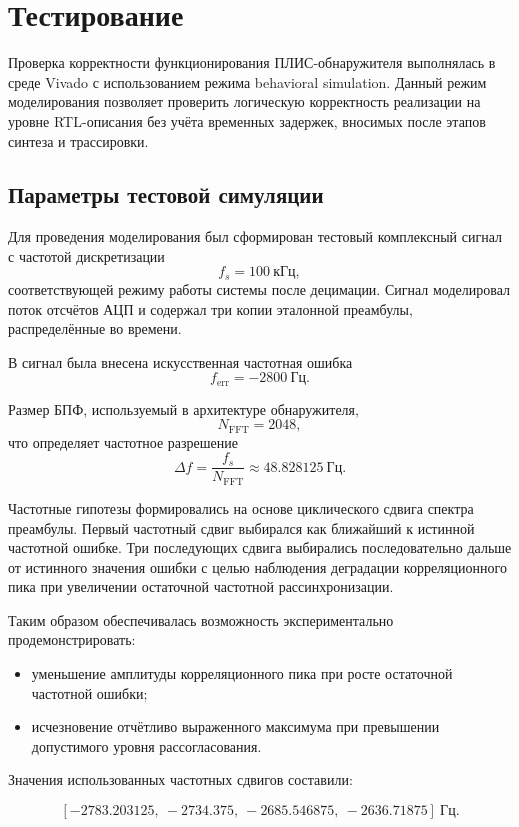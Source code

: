 \section{Тестирование}

Проверка корректности функционирования ПЛИС-обнаружителя выполнялась в среде 
Vivado
с использованием режима behavioral simulation. Данный режим моделирования позволяет проверить логическую корректность реализации на уровне RTL-описания без учёта временных задержек, вносимых после этапов синтеза и трассировки.

\subsection{Параметры тестовой симуляции}

Для проведения моделирования был сформирован тестовый комплексный сигнал с частотой дискретизации
\[
f_s = 100\ \text{кГц},
\]
соответствующей режиму работы системы после децимации. Сигнал моделировал поток отсчётов АЦП и содержал три копии эталонной преамбулы, распределённые во времени.

В сигнал была внесена искусственная частотная ошибка
\[
f_{\text{err}} = -2800\ \text{Гц}.
\]

Размер БПФ, используемый в архитектуре обнаружителя,
\[
N_{\text{FFT}} = 2048,
\]
что определяет частотное разрешение
\[
\Delta f = \frac{f_s}{N_{\text{FFT}}} \approx 48.828125\ \text{Гц}.
\]

Частотные гипотезы формировались на основе циклического сдвига спектра преамбулы.  
Первый частотный сдвиг выбирался как ближайший к истинной частотной ошибке.  
Три последующих сдвига выбирались последовательно дальше от истинного значения ошибки с целью наблюдения деградации корреляционного пика при увеличении остаточной частотной рассинхронизации.

Таким образом обеспечивалась возможность экспериментально продемонстрировать:
\begin{itemize}
\item уменьшение амплитуды корреляционного пика при росте остаточной частотной ошибки;
\item исчезновение отчётливо выраженного максимума при превышении допустимого уровня рассогласования.
\end{itemize}

Значения использованных частотных сдвигов составили:

\[
[-2783.203125,\ -2734.375,\ -2685.546875,\ -2636.71875]\ \text{Гц}.
\]

